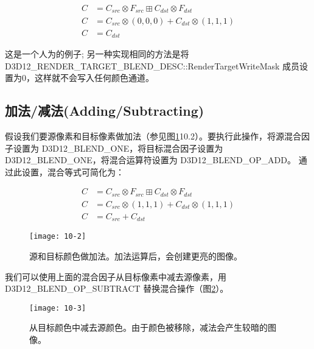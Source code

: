 \begin{align*}
C&=C_{src}\otimes F_{src}\boxplus C_{dst}\otimes F_{dst}\\
C&=C_{src}\otimes (0,0,0)+C_{dst}\otimes (1,1,1)\\
C&=C_{dst}
\end{align*}

\begin{flushleft}
这是一个人为的例子; 另一种实现相同的方法是将 D3D12\_RENDER\_TARGET\_BLEND\_DESC::RenderTargetWriteMask 成员设置为0，这样就不会写入任何颜色通道。\\
\end{flushleft}

\subsection{加法/减法(Adding/Subtracting)}
\begin{flushleft}
假设我们要源像素和目标像素做加法（参见图\ref{fig:10-2}10.2）。要执行此操作，将源混合因子设置为 D3D12\_BLEND\_ONE，将目标混合因子设置为 D3D12\_BLEND\_ONE，将混合运算符设置为 D3D12\_BLEND\_OP\_ADD。 通过此设置，混合等式可简化为：\\
\end{flushleft}

\begin{align*}
C&=C_{src}\otimes F_{src}\boxplus C_{dst}\otimes F_{dst}\\
C&=C_{src}\otimes (1,1,1)+C_{dst}\otimes (1,1,1)\\
C&=C_{src}+C_{dst}
\end{align*}

\begin{figure}[h]
    \texttt{[image: 10-2]}
    \centering
    \caption{源和目标颜色做加法。加法运算后，会创建更亮的图像。}
    \label{fig:10-2}
\end{figure}

\begin{flushleft}
我们可以使用上面的混合因子从目标像素中减去源像素，用 D3D12\_BLEND\_OP\_SUBTRACT 替换混合操作（图\ref{fig:10-3}）。
\end{flushleft}

\begin{figure}[h]
    \texttt{[image: 10-3]}
    \centering
    \caption{从目标颜色中减去源颜色。由于颜色被移除，减法会产生较暗的图像。}
    \label{fig:10-3}
\end{figure}

